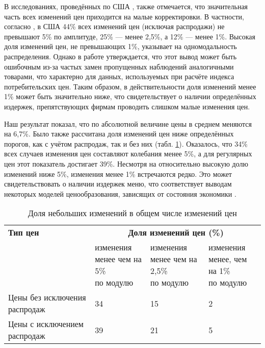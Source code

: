 В исследованиях, проведённых по США \cite{KlenowMalin2010, Midrigan2011}, также отмечается, что значительная часть всех изменений цен приходится на малые корректировки. В частности, согласно \cite{KlenowKryvtsov2008}, в США 44\% всех изменений цен (исключая распродажи) не превышают 5\% по амплитуде, 25\% — менее 2,5\%, а 12\% — менее 1\%. Высокая доля изменений цен, не превышающих 1\%, указывает на одномодальность распределения. Однако в работе \cite{cavallo2018scraped} утверждается, что этот вывод может быть ошибочным из-за частых замен пропущенных наблюдений аналогичными товарами, что характерно для данных, используемых при расчёте индекса потребительских цен. Таким образом, в действительности доля изменений менее 1\% может быть значительно ниже, что свидетельствует о наличии определённых издержек, препятствующих фирмам проводить слишком малые изменения цен.


Наш результат показал, что по абсолютной величине цены в среднем меняются на 6,7\%. Было также рассчитана доля изменений цен ниже определённых порогов, как с учётом распродаж, так и без них (табл. \ref{tab:small_price_changes}). Оказалось, что 34\% всех случаев изменения цен составляют колебания менее 5\%, а для регулярных цен этот показатель достигает 39\%. Несмотря на относительно высокую долю изменений ниже 5\%, изменения менее 1\% встречаются редко. Это может свидетельствовать о наличии издержек меню, что соответствует выводам некоторых моделей ценообразования, зависящих от состояния экономики \cite{golosov2007, Midrigan2011}.

\begin{table}[h]
	\centering
	\small %
	\caption{Доля небольших изменений в общем числе изменений цен}
	\label{tab:small_price_changes}
	\begin{tabularx}{\textwidth}{|X|X|X|X|} %
		\hline
		\textbf{Тип цен} & \multicolumn{3}{c|}{\textbf{Доля изменений цен (\%)}} \\
		\cline{2-4}
		& \makecell{изменения \\ менее чем на 5\% \\ по модулю} 
		& \makecell{изменения \\ менее чем на 2,5\% \\ по модулю} 
		& \makecell{изменения \\ менее, чем на 1\% \\ по модулю} \\
		\hline
		Цены без исключения распродаж & 34 & 15 & 2 \\
		\hline
		Цены с исключением распродаж & 39 & 21 & 5 \\
		\hline
	\end{tabularx}
\end{table}

